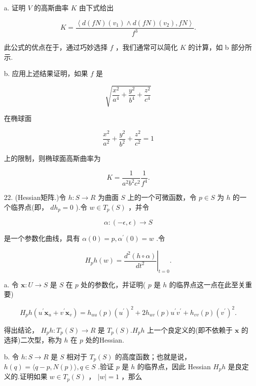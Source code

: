 a. 证明 \(V\) 的高斯曲率 \(K\) 由下式给出

\[
K = \frac{\left\langle  d\left( fN\right) \left( {v}_{1}\right)  \land  d\left( fN\right) \left( {v}_{2}\right) ,fN\right\rangle  }{{f}^{3}}.
\]

此公式的优点在于，通过巧妙选择 \(f\) ，我们通常可以简化 \(K\) 的计算，如 b 部分所示.

b. 应用上述结果证明，如果 \(f\) 是

\[
\sqrt{\frac{{x}^{2}}{{a}^{4}} + \frac{{y}^{2}}{{b}^{4}} + \frac{{z}^{2}}{{c}^{4}}}
\]

在椭球面

\[
\frac{{x}^{2}}{{a}^{2}} + \frac{{y}^{2}}{{b}^{2}} + \frac{{z}^{2}}{{c}^{2}} = 1
\]

上的限制，则椭球面高斯曲率为

\[
K = \frac{1}{{a}^{2}{b}^{2}{c}^{2}}\frac{1}{{f}^{4}}.
\]

22. (Hessian矩阵.)令 \(h : S \rightarrow  R\) 为曲面 \(S\) 上的一个可微函数，令 \(p \in  S\) 为 \(h\) 的一个临界点(即， \(d{h}_{p} = 0\) ).令 \(w \in  {T}_{p}\left( S\right)\) ，并令

\[
\alpha  : \left( {-\epsilon ,\epsilon }\right)  \rightarrow  S
\]

是一个参数化曲线，具有 \(\alpha \left( 0\right)  = p,{\alpha }^{\prime }\left( 0\right)  = w\) .令

\[
{H}_{p}h\left( w\right)  = {\left. \frac{{d}^{2}\left( {h \circ  \alpha }\right) }{d{t}^{2}}\right| }_{t = 0}.
\]

a. 令 \(\mathbf{x} : U \rightarrow  S\) 是 \(S\) 在 \(p\) 处的参数化，并证明( \(p\) 是 \(h\) 的临界点这一点在此至关重要)

\[
{H}_{p}h\left( {{u}^{\prime }{\mathbf{x}}_{u} + {v}^{\prime }{\mathbf{x}}_{v}}\right)  = {h}_{uu}\left( p\right) {\left( {u}^{\prime }\right) }^{2} + 2{h}_{uv}\left( p\right) {u}^{\prime }{v}^{\prime } + {h}_{vv}\left( p\right) {\left( {v}^{\prime }\right) }^{2}.
\]

得出结论， \({H}_{p}h : {T}_{p}\left( S\right)  \rightarrow  R\) 是 \({T}_{p}\left( S\right) .{H}_{p}h\) 上一个良定义的(即不依赖于 \(\mathbf{x}\) 的选择)二次型，称为 \(h\) 在 \(p\) 处的Hessian.

b. 令 \(h : S \rightarrow  R\) 是 \(S\) 相对于 \({T}_{p}\left( S\right)\) 的高度函数；也就是说， \(h\left( q\right)  = \langle q - p,N\left( p\right) \rangle ,q \in  S\) .验证 \(p\) 是 \(h\) 的临界点，因此 Hessian \({H}_{p}h\) 是良定义的.证明如果 \(w \in  {T}_{p}\left( S\right)\) ， \(\left| w\right|  = 1\) ，那么

